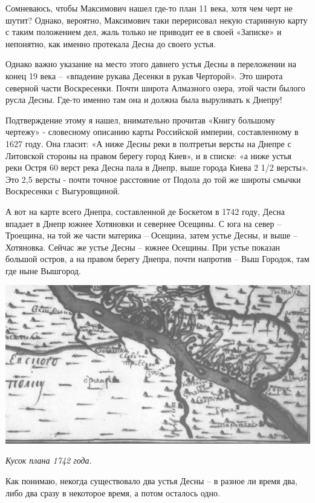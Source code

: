 Сомневаюсь, чтобы Максимович нашел где-то план 11 века, хотя чем черт не шутит? Однако, вероятно, Максимович таки перерисовал некую старинную карту с таким положением дел, жаль только не приводит ее в своей «Записке» и непонятно, как именно протекала Десна до своего устья. 

Однако важно указание на место этого давнего устья Десны в переложении на конец 19 века – «впадение рукава Десенки в рукав Черторой». Это широта северной части Воскресенки. Почти широта Алмазного озера, этой части былого русла Десны. Где-то именно там она и должна была выруливать к Днепру!

Подтверждение этому я нашел, внимательно прочитав «Книгу большому чертежу»\cite{chert} - словесному описанию карты Российской империи, составленному в 1627 году. Она гласит: «А ниже Десны реки в полтретьи версты на Днепре с Литовской стороны на правом берегу город Киев», и в списке: «а ниже устья реки Остря 60 верст река Десна пала в Днепр, выше города Киева 2 1/2 версты». Это 2,5 версты - почти точное расстояние от Подола до той же широты смычки Воскресенки с Выгуровщиной.

А вот на карте всего Днепра, составленной де Боскетом в 1742 году, Десна впадает в Днепр южнее Хотяновки и севернее Осещины. С юга на север – Троещина, на той же части материка – Осещина, затем устье Десны, и выше – Хотяновка. Сейчас же устье Десны – южнее Осещины. При устье показан большой остров, а на правом берегу Днепра, почти напротив – Выш Городок, там где ныне Вышгород.

\begin{center}
\includegraphics[width=\linewidth]{chast-gorodki/letopisi/1742-de_bosket.jpg}

\textit{Кусок плана 1742 года.}
\end{center}

Как понимаю, некогда существовало два устья Десны – в разное ли время два, либо два сразу в некоторое время, а потом осталось одно. 

